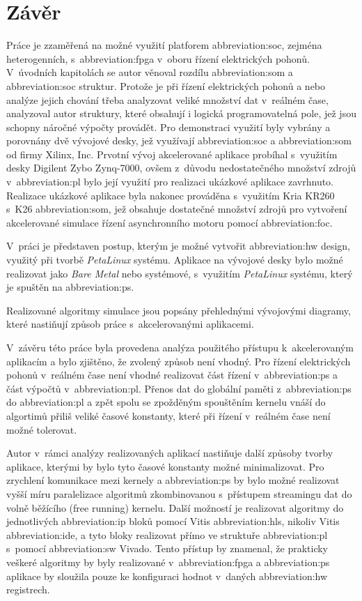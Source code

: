 \documentclass[a4paper, twoside, 11pt]{article}
\begin{document}
\section*{Závěr}
Práce je zzaměřená na možné využití platforem \gls{abbreviation:soc}, zejména heterogenních, s~\gls{abbreviation:fpga} v~oboru řízení elektrických pohonů. V~úvodních kapitolách se autor věnoval rozdílu \gls{abbreviation:som} a \gls{abbreviation:soc} struktur. Protože je při řízení elektrických pohonů a nebo analýze jejich chování třeba analyzovat veliké množství dat v~reálném čase, analyzoval autor struktury, které obsahují i logická programovatelná pole, jež jsou schopny náročné výpočty provádět. Pro demonstraci využití byly vybrány a porovnány dvě vývojové desky, jež využívají \gls{abbreviation:soc} a \gls{abbreviation:som} od firmy Xilinx, Inc. Prvotní vývoj akcelerované aplikace probíhal s~využitím desky Digilent Zybo Zynq-7000, ovšem z~důvodu nedostatečného množství zdrojů v~\gls{abbreviation:pl} bylo její využití pro realizaci ukázkové aplikace zavrhnuto. Realizace ukázkové aplikace byla nakonec prováděna s~využitím Kria KR260 s~K26 \gls{abbreviation:som}, jež obsahuje dostatečné množství zdrojů pro vytvoření akcelerované simulace řízení asynchronního motoru pomocí \gls{abbreviation:foc}.\par
V~práci je představen postup, kterým je možné vytvořit \gls{abbreviation:hw} design, využitý při tvorbě \textit{PetaLinux} systému. Aplikace na vývojové desky bylo možné realizovat jako \textit{Bare Metal} nebo systémové, s~využitím \textit{PetaLinux} systému, který je spuštěn na \gls{abbreviation:ps}.\par
Realizované algoritmy simulace jsou popsány přehlednými vývojovými diagramy, které nastiňují způsob práce s~akcelerovanými aplikacemi.\par
V~závěru této práce byla provedena analýza použitého přístupu k~akcelerovaným aplikacím a bylo zjištěno, že zvolený způsob není vhodný. Pro řízení elektrických pohonů v~reálném čase není vhodné realizovat část řízení v~\gls{abbreviation:ps} a část výpočtů v~\gls{abbreviation:pl}. Přenos dat do globální paměti z~\gls{abbreviation:ps} do \gls{abbreviation:pl} a zpět spolu se zpožděným spouštěním kernelu vnáší do algortimů přiliš veliké časové konstanty, které při řízení v~reálném čase není možné tolerovat.\par
Autor v~rámci analýzy realizovaných aplikací nastiňuje další způsoby tvorby aplikace, kterými by bylo tyto časové konstanty možné minimalizovat. Pro zrychlení komunikace mezi kernely a \gls{abbreviation:ps} by bylo možné realizovat vyšší míru paralelizace algoritmů zkombinovanou s~přístupem streamingu dat do volně běžícího (free running) kernelu. Další možností je realizovat algoritmy do jednotlivých \gls{abbreviation:ip} bloků pomocí Vitis \gls{abbreviation:hls}, nikoliv Vitis \gls{abbreviation:ide}, a tyto bloky realizovat přímo ve struktuře \gls{abbreviation:pl} s~pomocí \gls{abbreviation:sw} Vivado. Tento přístup by znamenal, že prakticky veškeré algoritmy by byly realizované v~\gls{abbreviation:fpga} a \gls{abbreviation:ps} aplikace by sloužila pouze ke konfiguraci hodnot v~daných \gls{abbreviation:hw} registrech.\par
\end{document}
